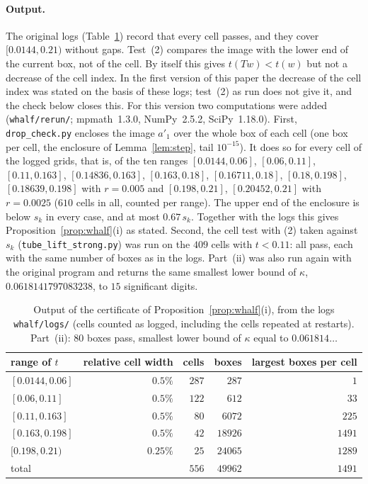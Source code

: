 \documentclass[11pt,a4paper]{article}
\theoremstyle{definition}
\theoremstyle{remark}
\newcommand{\code}[1]{\texttt{#1}}
\begin{document}
\paragraph{Output.}
{\sloppy The original logs (Table~\ref{tab:whalf}) record that every cell passes, and they cover $[0.0144,0.21)$ without gaps.
Test~(2) compares the image with the lower end of the current box, not of the cell.
By itself this gives $t(Tw)<t(w)$ but not a decrease of the cell index.
In the first version of this paper the decrease of the cell index was stated on the basis of these logs; test~(2) as run does not give it, and the check below closes this.
For this version two computations were added (\code{whalf/rerun/}; mpmath~1.3.0, NumPy~2.5.2, SciPy~1.18.0).
First, \code{drop\_check.py} encloses the image $a'_1$ over the whole box of each cell (one box per cell, the enclosure of Lemma~\ref{lem:step}, tail $10^{-15}$).
It does so for every cell of the logged grids, that is, of the ten ranges $[0.0144,0.06]$, $[0.06,0.11]$, $[0.11,0.163]$, $[0.14836,0.163]$, $[0.163,0.18]$, $[0.16711,0.18]$, $[0.18,0.198]$, $[0.18639,0.198]$ with $r=0.005$ and $[0.198,0.21]$, $[0.20452,0.21]$ with $r=0.0025$ ($610$ cells in all, counted per range).
The upper end of the enclosure is below $s_k$ in every case, and at most $0.67\,s_k$.
Together with the logs this gives Proposition~\ref{prop:whalf}(i) as stated.
Second, the cell test with (2) taken against $s_k$ (\code{tube\_lift\_strong.py}) was run on the $409$ cells with $t<0.11$: all pass, each with the same number of boxes as in the logs.
Part~(ii) was also run again with the original program and returns the same smallest lower bound of $\kappa$, $0.0618141797083238$, to $15$ significant digits.\par}

\begin{table}[ht]\centering\small
\begin{tabular}{lrrrr}
\toprule
range of $t$ & relative cell width & cells & boxes & largest boxes per cell \\
\midrule
$[0.0144,0.06]$ & $0.5\%$ & $287$ & $287$ & $1$ \\
$[0.06,0.11]$ & $0.5\%$ & $122$ & $612$ & $33$ \\
$[0.11,0.163]$ & $0.5\%$ & $80$ & $6072$ & $225$ \\
$[0.163,0.198]$ & $0.5\%$ & $42$ & $18926$ & $1491$ \\
$[0.198,0.21)$ & $0.25\%$ & $25$ & $24065$ & $1289$ \\
\midrule
total & & $556$ & $49962$ & $1491$ \\
\bottomrule
\end{tabular}
\caption{Output of the certificate of Proposition~\ref{prop:whalf}(i), from the logs \code{whalf/logs/} (cells counted as logged, including the cells repeated at restarts). Part~(ii): $80$ boxes pass, smallest lower bound of $\kappa$ equal to $0.061814\ldots$}\label{tab:whalf}
\end{table}
\end{document}
